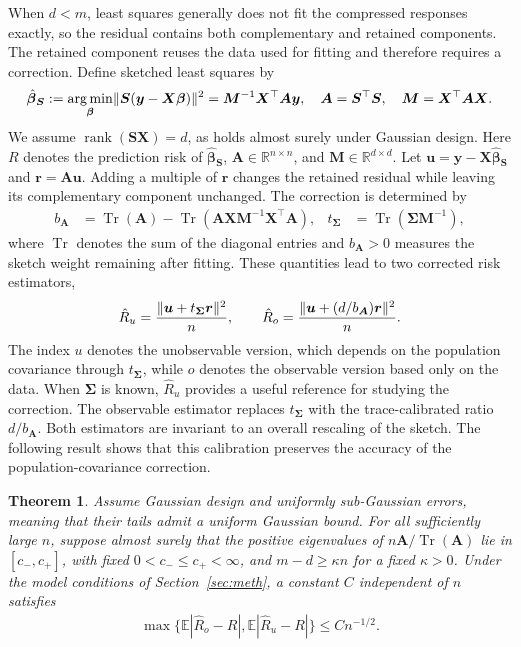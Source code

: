 \documentclass{article}
\theoremstyle{plain}
\newtheorem{theorem}{Theorem}[section]
\theoremstyle{definition}
\theoremstyle{definition}
\DeclarePairedDelimiter\norm{\lVert}{\rVert}
\def\argmin{\mathop{\rm arg\, min}}
\DeclareMathOperator{\trace}{Tr}
\DeclareMathOperator{\rank}{rank}
\def\R{{\mathbb{R}}}
\def\E{{\mathbb{E}}}
\def\mathbold{\boldsymbol}
\def\cal{\mathcal}
\def\bA{\mathbold{A}}\def\calA{{\cal A}}\def\scrA{{\mathscr A}}\def\Ahat{\widehat{A}}\def\Atil{{\widetilde A}}
\def\bM{\mathbold{M}}\def\hbM{{\widehat{\bM}}}\def\tbM{{\widetilde{\bM}}}
\def\br{\mathbold{r}}\def\rhat{\widehat{r}}\def\rtil{\widetilde{r}}\def\rbar{{\overline r}}
\def\bS{\mathbold{S}}\def\hbS{{\widehat{\bS}}}\def\tbS{{\widetilde{\bS}}}
\def\bu{\mathbold{u}}\def\uhat{\widehat{u}}\def\util{\widetilde{u}}\def\ubar{{\overline u}}
\def\bX{\mathbold{X}}\def\hbX{{\widehat{\bX}}}\def\tbX{{\tilde{\bX}}}\def\bXbar{{\overline \bX}}
\def\by{\mathbold{y}}\def\yhat{\widehat{y}}\def\ytil{\widetilde{y}}\def\ybar{{\overline y}}\def\vby{{\bf y}}
\def\bbeta{\mathbold{\beta}}\def\betahat{\widehat{\beta}}\def\hbeta{\widehat{\beta}}
\def\hbbeta{\hat{\bbeta}{}}
\def\bSigma{\mathbold{\Sigma}}\def\hbSigma{{\widehat{\bSigma}}}
\newcommand{\hR}{\hat{R}}
\begin{document}
When $d<m$, least squares generally does not fit the compressed responses exactly, so the residual contains both complementary and retained components. The retained component reuses the data used for fitting and therefore requires a correction. Define sketched least squares by
\begin{align*}
 \hbbeta_{\bS}
 :=\argmin_{\bbeta}\norm{\bS(\by-\bX\bbeta)}^2
 =\bM^{-1}\bX^\top\bA\by,\quad
 \bA=\bS^\top\bS,\quad \bM=\bX^\top\bA\bX.
\end{align*}
We assume $\rank(\bS\bX)=d$, as holds almost surely under Gaussian design. Here $R$ denotes the prediction risk of $\hbbeta_{\bS}$, $\bA\in\R^{n\times n}$, and $\bM\in\R^{d\times d}$. Let $\bu=\by-\bX\hbbeta_{\bS}$ and $\br=\bA\bu$. Adding a multiple of $\br$ changes the retained residual while leaving its complementary component unchanged. The correction is determined by
\begin{align*}
 b_{\bA}&=\trace(\bA)
       -\trace(\bA\bX\bM^{-1}\bX^\top\bA),&
 t_{\bSigma}&=\trace(\bSigma\bM^{-1}),
\end{align*}
where $\trace$ denotes the sum of the diagonal entries and $b_{\bA}>0$ measures the sketch weight remaining after fitting. These quantities lead to two corrected risk estimators,
\begin{align*}
 \hR_u=\frac{\norm{\bu+t_{\bSigma}\br}^2}{n},
 \qquad
 \hR_o=\frac{\norm{\bu+(d/b_{\bA})\br}^2}{n}.
\end{align*}
The index $u$ denotes the unobservable version, which depends on the population covariance through $t_{\bSigma}$, while $o$ denotes the observable version based only on the data. When $\bSigma$ is known, $\hR_u$ provides a useful reference for studying the correction. The observable estimator replaces $t_{\bSigma}$ with the trace-calibrated ratio $d/b_{\bA}$. Both estimators are invariant to an overall rescaling of the sketch. The following result shows that this calibration preserves the accuracy of the population-covariance correction.

\begin{theorem}
\label{thm:cpal-corrected-accuracy}
\label{thm:R-obs-general}
\label{thm:R-sens-general}
Assume Gaussian design and uniformly sub-Gaussian errors, meaning that
their tails admit a uniform Gaussian bound. For all sufficiently large
$n$, suppose almost surely that the positive eigenvalues of
$n\bA/\trace(\bA)$ lie in $[c_-,c_+]$, with fixed
$0<c_-\leq c_+<\infty$, and $m-d\geq\kappa n$ for a fixed $\kappa>0$.
Under the model conditions of Section~\ref{sec:meth}, a constant $C$
independent of $n$ satisfies
\begin{align}
 \max\{\E|\hR_o-R|,\E|\hR_u-R|\}\leq Cn^{-1/2}.
 \label{eq:cpal-corrected-accuracy}
\end{align}
\end{theorem}
\end{document}

